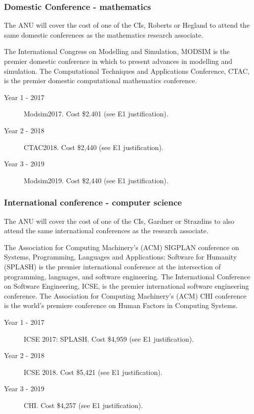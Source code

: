 \documentclass[a4paper,fontsize=12pt]{scrartcl}
\begin{document}
\subsubsection*{Domestic Conference - mathematics}

The ANU will cover the cost of one of the CIs, Roberts or Hegland 
to attend the  same domestic conferences as the mathematics 
research associate. 

The International Congress on Modelling and Simulation, 
MODSIM is the premier domestic conference in which to present 
advances in modelling and simulation. 
The Computational Techniques and Applications Conference, CTAC, 
is the premier domestic computational mathematics conference.

\begin{description}
\item[Year 1 - 2017] Modsim2017. Cost \$2.401  (see E1 justification).

\item[Year 2 - 2018] CTAC2018. Cost \$2,440  (see E1 justification).

\item[Year 3 - 2019] Modsim2019.  Cost \$2,440  (see E1 justification).


\end{description}

\subsubsection*{International conference - computer science}


The ANU will cover the cost of one of the CIs, Gardner or Strazdins 
to also attend the same international conferences as the 
research associate. 

The  Association for Computing Machinery’s (ACM) SIGPLAN 
conference on Systems, Programming, Languages and Applications: 
Software for Humanity (SPLASH) is the premier international 
conference at the intersection of programming, languages, 
and software engineering.
The International Conference on Software Engineering, ICSE, 
is the premier international software engineering conference.
The Association for Computing Machinery’s (ACM) CHI conference 
is the world's premiere conference on Human Factors in 
Computing Systems.

\begin{description}
\item[Year 1 - 2017] ICSE 2017: SPLASH. Cost \$4,959  (see E1 justification).

\item[Year 2 - 2018] ICSE 2018.  Cost \$5,421  (see E1 justification).

\item[Year 3 - 2019] CHI.  Cost \$4,257  (see E1 justification).

\end{description}
\end{document}

